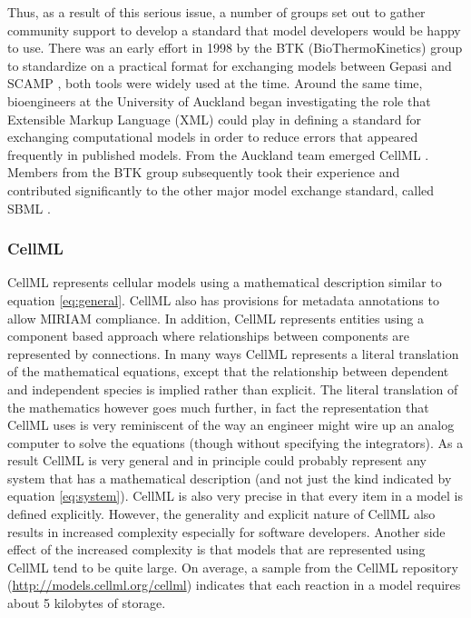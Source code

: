 Thus, as a result of this serious issue, a number of groups set out to
gather community support to develop a standard that model developers
would be happy to use. There was an early effort in 1998 by the BTK
(BioThermoKinetics) group to standardize on a practical format for
exchanging models between Gepasi \autocite{Gepasi:1993} and SCAMP
\autocite{SauroF91}, both tools were widely used at the time. Around the
same time, bioengineers at the University of Auckland began
investigating the role that Extensible Markup Language (XML)
\autocite{harold:2001} could play in defining a standard for exchanging
computational models in order to reduce errors that appeared frequently
in published models. From the Auckland team emerged CellML
\autocite{LloydCellML2004}. Members from the BTK group subsequently took
their experience and contributed significantly to the other major model
exchange standard, called SBML \autocite{hucka:2002d}.

\subsubsection{CellML}

CellML \autocite{LloydCellML2004} represents cellular models using a
mathematical description similar to equation \ref{eq:general}. CellML
also has provisions for metadata annotations to allow MIRIAM compliance.
In addition, CellML represents entities using a component based approach
where relationships between components are represented by connections.
In many ways CellML represents a literal translation of the mathematical
equations, except that the relationship between dependent and
independent species is implied rather than explicit. The literal
translation of the mathematics however goes much further, in fact the
representation that CellML uses is very reminiscent of the way an
engineer might wire up an analog computer to solve the equations (though
without specifying the integrators). As a result CellML is very general
and in principle could probably represent any system that has a
mathematical description (and not just the kind indicated by equation
\ref{eq:system}). CellML is also very precise in that every item in a
model is defined explicitly. However, the generality and explicit nature
of CellML also results in increased complexity especially for software
developers. Another side effect of the increased complexity is that
models that are represented using CellML tend to be quite large. On
average, a sample from the CellML repository
(\url{http://models.cellml.org/cellml}) indicates that each reaction in
a model requires about 5 kilobytes of storage.

